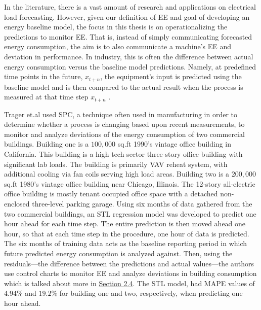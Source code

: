 In the literature, there is a vast amount of research and applications on electrical load forecasting. However, given our definition of EE and goal of developing an energy baseline model, the focus in this thesis is on operationalizing the predictions to monitor EE. That is, instead of simply communicating forecasted energy consumption, the aim is to also communicate a machine's EE and deviation in performance. In industry, this is often the difference between actual energy consumption versus the baseline model predictions. Namely, at predefined time points in the future, $x_{t+n}$, the equipment's input is predicted using the baseline model and is then compared to the actual result when the process is measured at that time step $x_{t+n}$ \cite{tightening}. 

Trager et.al \cite{tightening} used SPC, a technique often used in manufacturing in order to determine whether a process is changing based upon recent measurements, to monitor and analyze deviations of the energy consumption of two commercial buildings. Building one is a $100,000$ \ac{sq.ft} 1990’s vintage office building in California. This building is a high tech sector three-story office building with significant lab loads. The building is primarily \ac{VAV} reheat system, with additional cooling via fan coils serving high load areas. Building two is a $200,000$ sq.ft 1980’s vintage office building near Chicago, Illinois. The 12-story all-electric office building is mostly tenant occupied office space with a detached non-enclosed three-level parking garage. Using six months of data gathered from the two commercial buildings, an \ac{STL} regression model was developed to predict one hour ahead for each time step. The entire prediction is then moved ahead one hour, so that at each time step in the procedure, one hour of data is predicted. The six months of training data acts as the baseline reporting period in which future predicted energy consumption is analyzed against. Then, using the residuals—the difference between the predictions and actual values—the authors use control charts to monitor EE and analyze deviations in building consumption which is talked about more in \hyperlink{subsection.2.4}{Section 2.4}. The STL model, had \ac{MAPE} values of $4.94\%$ and $19.2\%$ for building one and two, respectively, when predicting one hour ahead.

